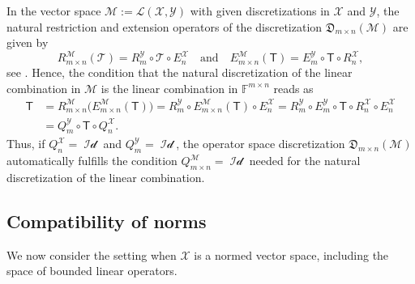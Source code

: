 \documentclass[a4paper]{paper}
\newcommand{\Discr}{\mathfrak{D}}
\newcommand{\Spc}[1]{\mathscr{#1}}
\newcommand{\Field}{\mathbb{F}}
\newcommand{\Op}[1]{\mathcal{#1}}
\newcommand{\DiscOp}[1]{\mathsf{#1}}
\newcommand*{\EXT}[2]{\ensuremath{E_{#1}^{#2}}}
\newcommand*{\REST}[2]{\ensuremath{R_{#1}^{#2}}}
\newcommand*{\COPROJ}[2]{\ensuremath{Q_{#1}^{#2}}}
\newcommand*{\RnX}{\ensuremath{\REST{n}{\Spc{X}}}}
\newcommand*{\RmY}{\ensuremath{\REST{m}{\Spc{Y}}}}
\newcommand*{\EnX}{\ensuremath{\EXT{n}{\Spc{X}}}}
\newcommand*{\EmY}{\ensuremath{\EXT{m}{\Spc{Y}}}}
\newcommand*{\QnX}{\ensuremath{\COPROJ{n}{\Spc{X}}}}
\newcommand*{\QmY}{\ensuremath{\COPROJ{m}{\Spc{Y}}}}
\DeclareMathOperator{\Id}{Id}
\begin{document}
\begin{remark}
 In the vector space $\Spc{M} := \Spc{L}(\Spc{X}, \Spc{Y})$ with given discretizations in $\Spc{X}$ and $\Spc{Y}$, the 
 natural restriction and extension operators of the discretization $\Discr_{m\times n}(\Spc{M})$ are given by
 \begin{equation*}
  \REST{m\times n}{\Spc{M}}(\Op{T}) = \RmY \circ \Op{T} \circ \EnX
  \quad\text{and}\quad
  \EXT{m\times n}{\Spc{M}}(\DiscOp{T}) = \EmY \circ \DiscOp{T} \circ \RnX,
 \end{equation*}
 see . Hence, the condition that the natural discretization of the linear 
 combination in $\Spc{M}$ is the linear combination in $\Field^{m\times n}$ reads as
 \begin{align*}
  \DiscOp{T} 
  &= \REST{m\times n}{\Spc{M}}\big( \EXT{m\times n}{\Spc{M}}(\DiscOp{T}) \big)
  = \RmY \circ \EXT{m\times n}{\Spc{M}}(\DiscOp{T}) \circ \EnX
  = \RmY \circ \EmY \circ \DiscOp{T} \circ \RnX \circ \EnX \\
  &= \QmY \circ \DiscOp{T} \circ \QnX.
 \end{align*}
 Thus, if $\QnX = \Op{\Id}$ and $\QmY = \Op{\Id}$, the operator space discretization $\Discr_{m\times n}(\Spc{M})$ 
 automatically fulfills the condition $\COPROJ{m\times n}{\Spc{M}} = \Op{\Id}$ needed for the natural discretization of 
 the linear combination.
\end{remark}



\subsection{Compatibility of norms}

We now consider the setting when $\Spc{X}$ is a normed vector space, including the space of bounded linear operators.
\end{document}
